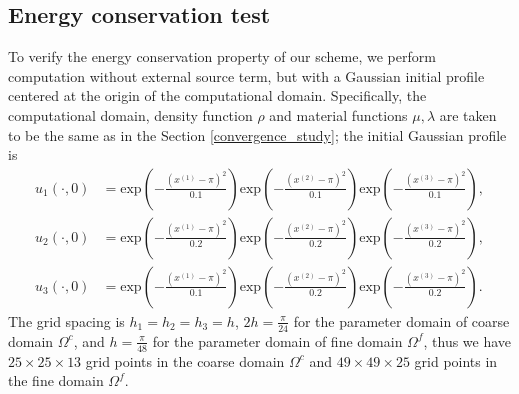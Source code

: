 \subsection{Energy conservation test}\label{conserved_energy}
To verify the energy conservation property of our scheme, we perform computation without external source term, but with a Gaussian initial profile  centered at the origin of the computational domain.  Specifically, the computational domain, density function $\rho$ and material functions $\mu, \lambda$ are taken to be the same as in the Section \ref{convergence_study}; the initial Gaussian profile is
\begin{align*}
	u_1(\cdot,0) &= \mbox{exp}\left(-\frac{(x^{(1)}-\pi)^2}{0.1}\right)\mbox{exp}\left(-\frac{(x^{(2)}-\pi)^2}{0.1}\right)\mbox{exp}\left(-\frac{(x^{(3)}-\pi)^2}{0.1}\right),\\
	u_2(\cdot,0) &= \mbox{exp}\left(-\frac{(x^{(1)}-\pi)^2}{0.2}\right)\mbox{exp}\left(-\frac{(x^{(2)}-\pi)^2}{0.2}\right)\mbox{exp}\left(-\frac{(x^{(3)}-\pi)^2}{0.2}\right),\\
	u_3(\cdot,0) &= \mbox{exp}\left(-\frac{(x^{(1)}-\pi)^2}{0.1}\right)\mbox{exp}\left(-\frac{(x^{(2)}-\pi)^2}{0.2}\right)\mbox{exp}\left(-\frac{(x^{(3)}-\pi)^2}{0.2}\right).
\end{align*}
 The grid spacing is $h_1 = h_2 = h_3 = h$, $2h = \frac{\pi}{24}$ for the parameter domain of coarse domain $\Omega^c$, and $h = \frac{\pi}{48}$ for the parameter domain of fine domain $\Omega^f$, thus we have $25\times25\times13$ grid points in the coarse domain $\Omega^c$ and $49\times49\times25$ grid points in the fine domain $\Omega^f$. 

